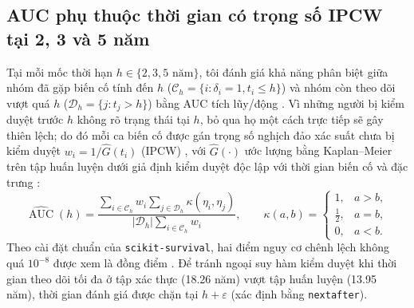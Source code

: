 \subsection{AUC phụ thuộc thời gian có trọng số IPCW tại 2, 3 và 5 năm}
Tại mỗi mốc thời hạn $h \in \{2, 3, 5\text{ năm}\}$, tôi đánh giá khả năng phân biệt giữa nhóm đã gặp biến cố tính đến $h$ ($\mathcal C_h=\{i:\delta_i=1,t_i\leq h\}$) và nhóm còn theo dõi vượt quá $h$ ($\mathcal D_h=\{j:t_j>h\}$) bằng AUC tích lũy/động \cite{hung2010time}. Vì những người bị kiểm duyệt trước $h$ không rõ trạng thái tại $h$, bỏ qua họ một cách trực tiếp sẽ gây thiên lệch; do đó mỗi ca biến cố được gán trọng số nghịch đảo xác suất chưa bị kiểm duyệt $w_i = 1/\widehat G(t_i)$ (IPCW) \cite{polsterl2020scikit,hung2010time}, với $\widehat G(\cdot)$ ước lượng bằng Kaplan--Meier trên tập huấn luyện dưới giả định kiểm duyệt độc lập với thời gian biến cố và đặc trưng \cite{sksurvauc}:
\begin{equation}
 \widehat{\operatorname{AUC}}(h)=
 \frac{\displaystyle\sum_{i\in\mathcal C_h}w_i
 \sum_{j\in\mathcal D_h}\kappa(\eta_i,\eta_j)}
 {\displaystyle |\mathcal D_h|\sum_{i\in\mathcal C_h}w_i},
 \qquad
 \kappa(a,b)=\begin{cases}
 1,&a>b,\\
 \tfrac12,&a=b,\\
 0,&a<b.
 \end{cases}
 \label{eq:ipcw-auc}
\end{equation}
Theo cài đặt chuẩn của \texttt{scikit-survival}, hai điểm nguy cơ chênh lệch không quá $10^{-8}$ được xem là đồng điểm \cite{sksurvauc}. Để tránh ngoại suy hàm kiểm duyệt khi thời gian theo dõi tối đa ở tập xác thực (18.26 năm) vượt tập huấn luyện (13.95 năm), thời gian đánh giá được chặn tại $h+\varepsilon$ (xác định bằng \texttt{nextafter}).
